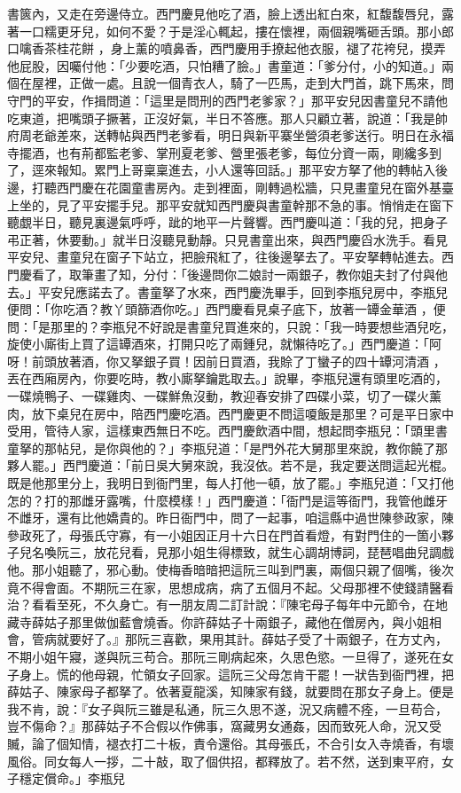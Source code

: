 \begin{showcontents}{}
書篋內，又走在旁邊侍立。西門慶見他吃了酒，臉上透出紅白來，紅馥馥唇兒，露著一口糯更牙兒，如何不愛？于是淫心輒起，摟在懷裡，兩個親嘴砸舌頭。那小郎口噙香茶桂花餅 ，身上薰的噴鼻香，西門慶用手撩起他衣服，褪了花袴兒，摸弄他屁股，因囑付他：「少要吃酒，只怕糟了臉。」書童道：「爹分付，小的知道。」兩個在屋裡，正做一處。且說一個青衣人，騎了一匹馬，走到大門首，跳下馬來，問守門的平安，作揖問道：「這里是問刑的西門老爹家？」那平安兒因書童兒不請他吃東道，把嘴頭子撅著，正沒好氣，半日不答應。那人只顧立著，說道：「我是帥府周老爺差來，送轉帖與西門老爹看，明日與新平寨坐營須老爹送行。明日在永福寺擺酒，也有荊都監老爹、掌刑夏老爹、營里張老爹，每位分資一兩，剛纔多到了，逕來報知。累門上哥稟稟進去，小人還等回話。」那平安方拏了他的轉帖入後邊，打聽西門慶在花園童書房內。走到裡面，剛轉過松牆，只見畫童兒在窗外基臺上坐的，見了平安擺手兒。那平安就知西門慶與書童幹那不急的事。悄悄走在窗下聽覷半日，聽見裏邊氣呼呼，跐的地平一片聲響。西門慶叫道：「我的兒，把身子弔正著，休要動。」就半日沒聽見動靜。只見書童出來，與西門慶舀水洗手。看見平安兒、畫童兒在窗子下站立，把臉飛紅了，往後邊拏去了。平安拏轉帖進去。西門慶看了，取筆畫了知，分付：「後邊問你二娘討一兩銀子，教你姐夫封了付與他去。」平安兒應諾去了。書童拏了水來，西門慶洗畢手，回到李瓶兒房中，李瓶兒便問：「你吃酒？教丫頭篩酒你吃。」西門慶看見桌子底下，放著一罈金華酒 ，便問：「是那里的？李瓶兒不好說是書童兒買進來的，只說：「我一時要想些酒兒吃，旋使小廝街上買了這罈酒來，打開只吃了兩鍾兒，就懶待吃了。」西門慶道：「阿呀！前頭放著酒，你又拏銀子買！因前日買酒，我賒了丁蠻子的四十罈河清酒 ，丟在西廂房內，你要吃時，教小廝拏鑰匙取去。」說畢，李瓶兒還有頭里吃酒的，一碟燒鴨子、一碟雞肉、一碟鮮魚沒動，教迎春安排了四碟小菜，切了一碟火薰肉，放下桌兒在房中，陪西門慶吃酒。西門慶更不問這嗄飯是那里？可是平日家中受用，管待人家，這樣東西無日不吃。西門慶飲酒中間，想起問李瓶兒：「頭里書童拏的那帖兒，是你與他的？」李瓶兒道：「是門外花大舅那里來說，教你饒了那夥人罷。」西門慶道：「前日吳大舅來說，我沒依。若不是，我定要送問這起光棍。既是他那里分上，我明日到衙門里，每人打他一頓，放了罷。」李瓶兒道：「又打他怎的？打的那雌牙露嘴，什麼模樣！」西門慶道：「衙門是這等衙門，我管他雌牙不雌牙，還有比他嬌貴的。昨日衙門中，問了一起事，咱這縣中過世陳參政家，陳參政死了，母張氏守寡，有一小姐因正月十六日在門首看燈，有對門住的一箇小夥子兒名喚阮三，放花兒看，見那小姐生得標致，就生心調胡博詞，琵琶唱曲兒調戲他。那小姐聽了，邪心動。使梅香暗暗把這阮三叫到門裏，兩個只親了個嘴，後次竟不得會面。不期阮三在家，思想成病，病了五個月不起。父母那裡不使錢請醫看治？看看至死，不久身亡。有一朋友周二訂計說：『陳宅母子每年中元節令，在地藏寺薛姑子那里做伽藍會燒香。你許薛姑子十兩銀子，藏他在僧房內，與小姐相會，管病就要好了。』那阮三喜歡，果用其計。薛姑子受了十兩銀子，在方丈內，不期小姐午寢，遂與阮三苟合。那阮三剛病起來，久思色慾。一旦得了，遂死在女子身上。慌的他母親，忙領女子回家。這阮三父母怎肯干罷！一狀告到衙門裡，把薛姑子、陳家母子都拏了。依著夏龍溪，知陳家有錢，就要問在那女子身上。便是我不肯，說：『女子與阮三雖是私通，阮三久思不遂，況又病體不痊，一旦苟合，豈不傷命？』那薛姑子不合假以作佛事，窩藏男女通姦，因而致死人命，況又受贓，論了個知情，褪衣打二十板，責令還俗。其母張氏，不合引女入寺燒香，有壞風俗。同女每人一拶，二十敲，取了個供招，都釋放了。若不然，送到東平府，女子穩定償命。」李瓶兒
\end{showcontents}
